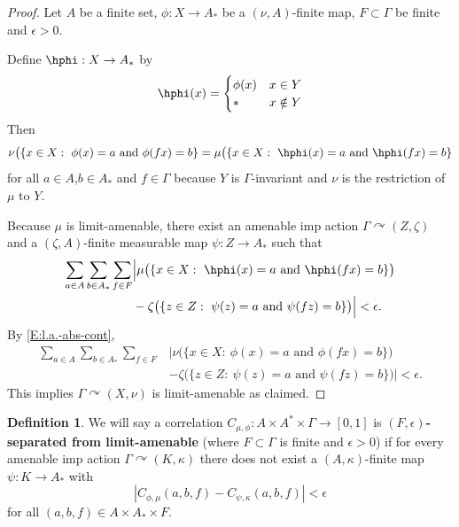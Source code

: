\documentclass[12pt]{article}
\theoremstyle{plain}
\theoremstyle{definition}
\newtheorem{defn}{Definition}
\theoremstyle{remark}
\newcommand{\G}{\Gamma}
\newcommand{\eps}{\epsilon}
\def\cc{{\curvearrowright}}
\begin{document}
\begin{proof}
    Let $A$ be a finite set, $\phi:X \to A_*$ be a $(\nu,A)$-finite map, $F \subset \G$ be finite and $\eps>0$.
    
    Define $\hphi:X \to A_*$ by
\begin{displaymath}
    \hphi(x) =
    \begin{cases}
        \phi(x) & x\in Y \\
        * &  x \notin Y
    \end{cases}
\end{displaymath}
    Then 
\begin{align}\label{E:l.a.-abs-cont}
    \nu\big(\{x\in X:~ \phi(x)=a \textrm{ and } \phi(fx)=b\} = \mu\big(\{x\in X:~ \hphi(x)=a \textrm{ and } \hphi(fx)=b\}
\end{align}
for all $a\in A$,$b\in A_*$ and $f\in \G$ because $Y$ is $\G$-invariant and $\nu$ is the restriction of $\mu$ to $Y$.

Because $\mu$ is limit-amenable, there exist an amenable imp action $\G \cc (Z,\zeta)$ and a $(\zeta,A)$-finite measurable map $\psi:Z \to A_*$ such that  
\begin{align*}
    \sum_{a\in A} \sum_{b \in A_*} \sum_{f\in F}& \Big|\mu\big(\{x\in X:~ \hphi(x)=a \textrm{ and } \hphi(fx)=b\}\big)\\
    &- \zeta\big(\{z\in Z:~ \psi(z)=a \textrm{ and } \psi(fz)=b\}\big)\Big|<\eps.
\end{align*} 
By \eqref{E:l.a.-abs-cont},
\begin{align*}
    \sum_{a\in A} \sum_{b \in A_*} \sum_{f\in F}& \Big|\nu\big(\{x\in X:~ \phi(x)=a \textrm{ and } \phi(fx)=b\}\big)\\
    &- \zeta\big(\{z\in Z:~ \psi(z)=a \textrm{ and } \psi(fz)=b\}\big)\Big|<\eps.
\end{align*} 
This implies $\G \cc (X,\nu)$ is limit-amenable as claimed.
\end{proof}



\begin{defn}
    We will say a correlation $C_{\mu,\phi}:A \times A^* \times \G \to [0,1]$ is {\bf $(F,\eps)$-separated from limit-amenable} (where $F \subset \G$ is finite and $\eps>0$) if for every amenable imp action $\G \cc (K,\kappa)$ there does not exist a $(A,\kappa)$-finite map $\psi:K \to A_*$ with 
$$|C_{\phi,\mu}(a,b,f) - C_{\psi,\kappa}(a,b,f)|<\eps$$
for all $(a,b,f) \in A \times A_*\times F$. 
\end{defn}
\end{document}
